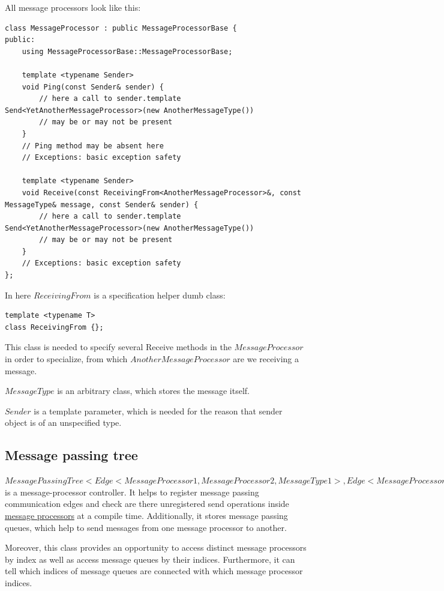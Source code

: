 \documentclass{article}
\begin{document}
All message processors look like this:
\begin{lstlisting}
class MessageProcessor : public MessageProcessorBase {
public:
	using MessageProcessorBase::MessageProcessorBase;

	template <typename Sender>
	void Ping(const Sender& sender) {
		// here a call to sender.template Send<YetAnotherMessageProcessor>(new AnotherMessageType())
		// may be or may not be present
	}
	// Ping method may be absent here
	// Exceptions: basic exception safety

	template <typename Sender>
	void Receive(const ReceivingFrom<AnotherMessageProcessor>&, const MessageType& message, const Sender& sender) {
		// here a call to sender.template Send<YetAnotherMessageProcessor>(new AnotherMessageType())
		// may be or may not be present
	}
	// Exceptions: basic exception safety
};
\end{lstlisting}
In here $ReceivingFrom$ is a specification helper dumb class:
\begin{lstlisting}
template <typename T>
class ReceivingFrom {};
\end{lstlisting}
This class is needed to specify several Receive methods in the $MessageProcessor$ in order to specialize, from which $AnotherMessageProcessor$ are we receiving a message.

$MessageType$ is an arbitrary class, which stores the message itself.

$Sender$ is a template parameter, which is needed for the reason that sender object is of an unspecified type.

\subsection{Message passing tree}

$MessagePassingTree<Edge<MessageProcessor1, MessageProcessor2, MessageType1>, Edge<MessageProcessor3, MessageProcessor4, MessageType2>, ...>$ is a message-processor controller. It helps to register message passing communication edges and check are there unregistered send operations inside \hyperref[subsec:message_processor]{message processors} at a compile time. Additionally, it stores message passing queues, which help to send messages from one message processor to another.

Moreover, this class provides an opportunity to access distinct message processors by index as well as access message queues by their indices. Furthermore, it can tell which indices of message queues are connected with which message processor indices.
\end{document}
